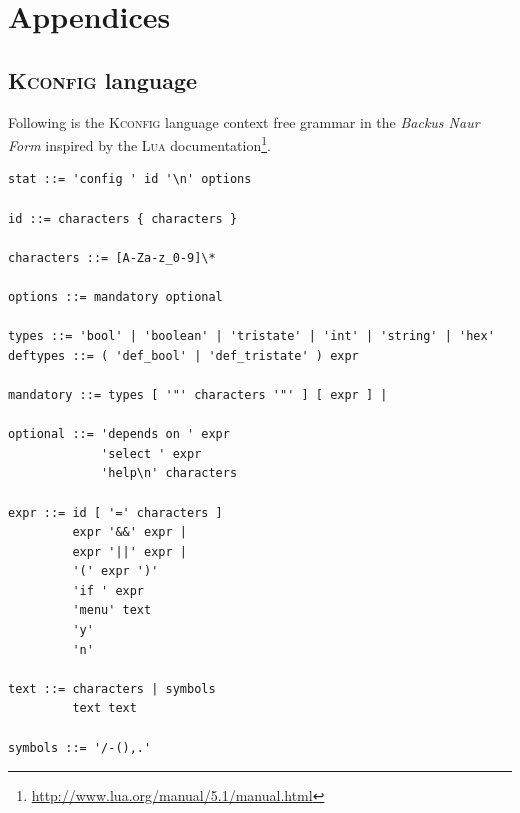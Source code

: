 \documentclass[a4paper,11pt]{report}
\newcommand{\f}{\footnote{\fn}}
\begin{document}
\newpage




            \newpage
            \chapter{Appendices}


            \section{\textsc{Kconfig} language}
            \label{app:kconfig}

            \def \fn {\url{http://www.lua.org/manual/5.1/manual.html}}

Following is the \textsc{Kconfig} language context free grammar in the 
\emph{Backus Naur Form} inspired by the \textsc{Lua} documentation\f.

\begin{verbatim}
stat ::= 'config ' id '\n' options

id ::= characters { characters }

characters ::= [A-Za-z_0-9]\*

options ::= mandatory optional

types ::= 'bool' | 'boolean' | 'tristate' | 'int' | 'string' | 'hex'
deftypes ::= ( 'def_bool' | 'def_tristate' ) expr

mandatory ::= types [ '"' characters '"' ] [ expr ] |

optional ::= 'depends on ' expr
             'select ' expr
             'help\n' characters

expr ::= id [ '=' characters ] 
         expr '&&' expr |
         expr '||' expr |
         '(' expr ')'
         'if ' expr
         'menu' text
         'y'
         'n'

text ::= characters | symbols 
         text text

symbols ::= '/-(),.'

\end{verbatim}


\end{document}

